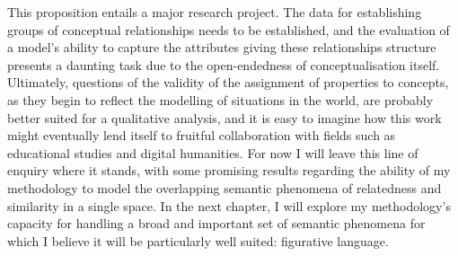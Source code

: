 This proposition entails a major research project.  The data for establishing groups of conceptual relationships needs to be established, and the evaluation of a model's ability to capture the attributes giving these relationships structure presents a daunting task due to the open-endedness of conceptualisation itself.  Ultimately, questions of the validity of the assignment of properties to concepts, as they begin to reflect the modelling of situations in the world, are probably better suited for a qualitative analysis, and it is easy to imagine how this work might eventually lend itself to fruitful collaboration with fields such as educational studies and digital humanities.  For now I will leave this line of enquiry where it stands, with some promising results regarding the ability of my methodology to model the overlapping semantic phenomena of relatedness and similarity in a single space.  In the next chapter, I will explore my methodology's capacity for handling a broad and important set of semantic phenomena for which I believe it will be particularly well suited: figurative language.

